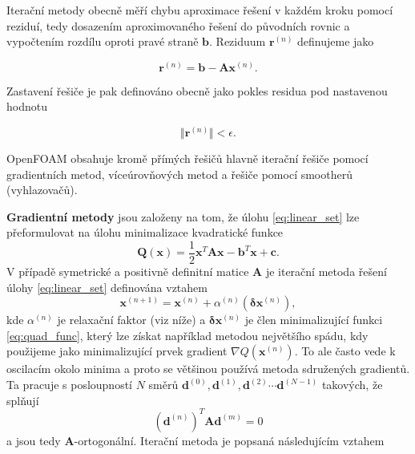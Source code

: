 \documentclass[a4paper,12pt]{report}
\theoremstyle{remark}
\begin{document}
	Iterační metody obecně měří chybu aproximace řešení v každém kroku pomocí reziduí, tedy dosazením aproximovaného řešení do původních rovnic a vypočtením rozdílu oproti pravé straně $\boldsymbol{b}$. Reziduum $\boldsymbol{r} ^{(n)} $ definujeme jako 

	\begin{equation}
		\boldsymbol{r} ^{(n)} = \boldsymbol{b}-\boldsymbol{A} \boldsymbol{x}^{(n)}.
		\label{eq:residuum}
	\end{equation} 

Zastavení řešiče je pak definováno obecně jako pokles residua pod nastavenou hodnotu

$$\Vert{\boldsymbol{r}^{(n)}}\Vert < \epsilon.$$
	
	OpenFOAM obsahuje kromě přímých řešičů hlavně iterační řešiče pomocí gradientních metod, víceúrovňových metod a řešiče pomocí smootherů (vyhlazovačů).
	
\textbf{Gradientní metody} jsou založeny na tom, že úlohu \eqref{eq:linear_set} lze přeformulovat na úlohu minimalizace kvadratické funkce
\begin{equation}
	\boldsymbol{Q}(\boldsymbol{x}) = \frac{1}{2} \boldsymbol{x}^T \boldsymbol{A} \boldsymbol{x}-\boldsymbol{b}^T \boldsymbol{x} + \boldsymbol{c}.
	\label{eq:quad_func}
\end{equation}
V případě symetrické a positivně definitní matice $\boldsymbol{A}$ je iterační metoda řešení úlohy \eqref{eq:linear_set} definována vztahem
\begin{equation}
	\boldsymbol{x}^{(n+1)} = \boldsymbol{x}^{(n)} + \alpha^{(n)} \left( \boldsymbol{\delta} \boldsymbol{x}^{(n)} \right),
	\label{eq:grad_iter}
\end{equation}
kde $\alpha^{(n)}$ je relaxační faktor (viz níže) a $\boldsymbol{\delta} \boldsymbol{x}^{(n)}$ je člen minimalizující funkci \eqref{eq:quad_func}, který lze získat například metodou největšího spádu, kdy použijeme jako minimalizující prvek gradient $\nabla Q(\boldsymbol{x}^{(n)})$. To ale často vede k oscilacím okolo minima a proto se většinou používá metoda sdružených gradientů. Ta pracuje s posloupností $N$ směrů  $\boldsymbol{d}^{(0)}, \boldsymbol{d}^{(1)}, \boldsymbol{d}^{(2)} \cdots \boldsymbol{d}^{(N-1)}$ takových, že splňují
\begin{equation*}
	\left(\boldsymbol{d}^{(n)}\right)^T\boldsymbol{A} \boldsymbol{d}^{(m)} = 0
\end{equation*}
a jsou tedy $\boldsymbol{A}$-ortogonální. Iterační metoda je popsaná následujícím vztahem
\end{document}
